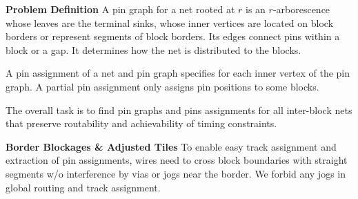 \documentclass[a2paper]{bigsposter}
\begin{document}
\begin{blockrow}[3]
\textbf{Problem Definition}
A pin graph for a net rooted at $r$ is an $r$-arborescence whose
leaves are the terminal sinks, whose inner vertices are located on block
borders or represent segments of block borders. Its edges connect pins 
within a block or a gap.
It determines how the net is distributed to the blocks.

A pin assignment of a net and pin graph specifies for each inner vertex of the pin graph. A partial pin assignment only assigns pin positions to some blocks. %

%
The overall task is to find pin graphs and pins assignments for all
inter-block nets that preserve routability and achievability of
timing constraints.


\begin{comment}
	

  \blocktitle{Previous work}
  Early pin assignment algorithms were based on concentric circuits \cite{koren1972pin}
  and topological models \cite{brady1984approach}.
  Later, pin assignment was combined with global routing
  \cite{cong1991pin, wang1991simultaneous, KoideWY-PinAssignmentWithGLobalRouting96, Chen+IntegratedFloorplanningAndInterconnectPlanning:1999},
  considering congestion (essentially) on the block borders using a so-called channel connection graph, and deriving
  pin positions from global routing. Among these works,  \cite{wang1991simultaneous}  allows the creation of feedthrough routes.
  An integration of pin assignment  with floorplanning for two-pin nets is considered in  \cite{pedram1990floorplanning}.
  
  Minimum-cost flow algorithms for laying out all 2-pin nets from one
  block to all others simultaneously were used \cite{xiang2003min}, also
  including buffer planning \cite{xiang2005algorithm}.
  
  According to \cite{Scheffer-IndustrialFloorplanningAndPrototyping08}, most of the above techniques are not applied in industrial floorplanning tools.
  Instead,  a rough timing-aware routing is done on a flattened netlist and pins are assigned
  where the boundaries are crossed \cite{Scheffer-IndustrialFloorplanningAndPrototyping08}.
  Boundary assertions are mostly created based on the zero slack algorithm
  \cite{nair+berman+hauge+yoffa:1989,Scheffer-IndustrialFloorplanningAndPrototyping08}.
  \blockbreak
\end{comment}
\blockbreak
 
  \textbf{Border Blockages \& Adjusted Tiles}
  \label{sec:tiles_n_border_blockages}
  To enable easy track assignment and extraction of pin assignments,  wires
  need to  cross block boundaries with straight segments  w/o interference by vias or jogs near the border.
  We forbid any jogs in global routing and track assignment.
  

\end{blockrow}
\end{document}
